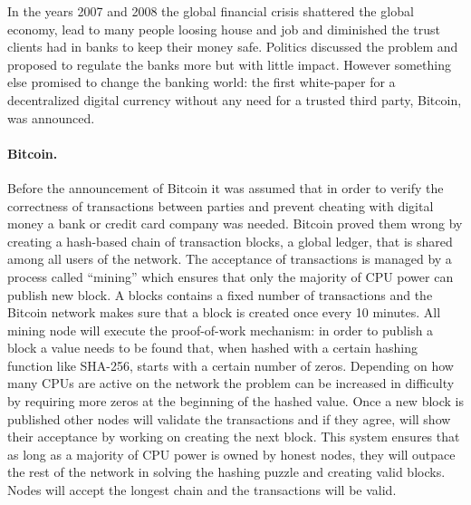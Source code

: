 In the years 2007 and 2008 the global financial crisis shattered the global economy, lead to many
people loosing house and job and diminished the trust clients had in banks to keep their money safe.
Politics discussed the problem and proposed to regulate the banks more but with little impact. 
However something else promised to change the banking world: the first white-paper for a 
decentralized digital currency without any need for a trusted third party, Bitcoin, was announced. 

\paragraph{Bitcoin.}
Before the announcement of Bitcoin it was assumed that in order to verify the correctness of 
transactions between parties and prevent cheating with digital money a bank or credit card company
was needed. Bitcoin proved them wrong by creating a hash-based chain of transaction blocks, a global 
ledger, that is shared among all users of the network. The acceptance of transactions is managed by 
a process called ``mining'' which ensures that only the majority of CPU power can publish new 
block. A blocks contains a fixed number of transactions and the Bitcoin network makes sure that a
block is created once every 10 minutes. All mining node will execute the proof-of-work mechanism: 
in order to publish a block a value needs to be found that, when hashed with a certain hashing 
function like SHA-256, starts with a certain number of zeros. Depending on how many CPUs are active
on the network the problem can be increased in difficulty by requiring more zeros at the beginning 
of the hashed value. Once a new block is published other nodes will validate the transactions and 
if they agree, will show their acceptance by working on creating the next block. This system ensures
that as long as a majority of CPU power is owned by honest nodes, they will outpace the rest of the
network in solving the hashing puzzle and creating valid blocks. Nodes will accept the longest chain
and the transactions will be valid.

